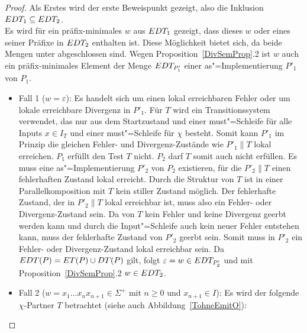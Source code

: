 \begin{proof}
  Als Erstes wird der erste Beweispunkt gezeigt, also die Inklusion $EDT
  _1\subseteq EDT _2$.\\
  Es wird für ein präfix-minimales $w$ aus $EDT _1$ gezeigt, dass dieses $w$
  oder eines seiner Präfixe in $EDT _2$ enthalten ist. Diese Möglichkeit
  bietet sich, da beide Mengen unter \cont{} abgeschlossen sind. Wegen
  Proposition~\ref{DivSemProp}.2 ist $w$ auch ein präfix-minimales Element der
  Menge $EDT _{P'_1}$ einer as"=Implementierung $P'_1$ von $P_1$.
  \begin{itemize}
    \item Fall 1 ($w=\varepsilon$): Es handelt sich um einen lokal erreichbaren
      Fehler oder um lokale erreichbare Divergenz in $P'_1$. Für $T$ wird ein
      Transitionssystem verwendet, das nur aus dem Startzustand und einer
      must"=Schleife für alle Inputs $x\in I_T$ und einer must"=Schleife für
      $\chi$ besteht. Somit kann $P'_1$ im Prinzip die gleichen Fehler- und
      Divergenz-Zustände wie $P'_1\|T$ lokal erreichen. $P_1$ erfüllt den Test
      $T$ nicht. $P_2$ darf $T$ somit auch nicht erfüllen. Es muss eine
      as"=Implementierung $P'_2$ von $P_2$ existieren, für die $P'_2\|T$ einen
      fehlerhaften Zustand lokal erreicht. Durch die Struktur von $T$ ist in
      einer Parallelkomposition mit $T$ kein stiller Zustand möglich. Der
      fehlerhafte Zustand, der in $P'_2\|T$ lokal erreichbar ist, muss also ein
      Fehler- oder Divergenz-Zustand sein. Da von $T$ kein Fehler und keine
      Divergenz geerbt werden kann und durch die Input"=Schleife auch kein
      neuer Fehler entstehen kann, muss der fehlerhafte Zustand von $P'_2$
      geerbt sein. Somit muss in $P'_2$ ein Fehler- oder Divergenz-Zustand
      lokal erreichbar sein. Da $EDT (P) =ET (P)\cup DT (P)$ gilt, folgt
      $\varepsilon = w\in EDT _{P'_2}$ und mit Proposition~\ref{DivSemProp}.2
      $w\in EDT _2$.
    \item Fall 2 ($w=x_1\dots x_n x_{n+1}\in\Sigma ^+$ mit $n\geq 0$ und
      $x_{n+1}\in I$): Es wird der folgende $\chi$-Partner $T$ betrachtet
      (siehe auch Abbildung~\ref{TohneEmitO}):
\end{itemize}
\end{proof}
